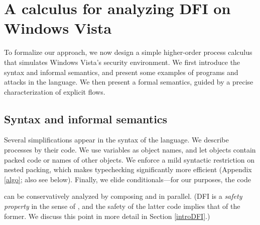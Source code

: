 \documentclass{sigplanconf}
\begin{document}
\section{A calculus for analyzing DFI on Windows Vista}\label{calc}
To formalize our approach, we now design a simple higher-order process calculus that simulates Windows Vista's security environment. We first introduce the syntax and informal semantics, and present some examples of programs and attacks in the language. We then present a formal semantics, guided by a precise characterization of explicit flows. 

\subsection{Syntax and informal semantics}

Several simplifications appear in the syntax of the language. We describe processes by their code. We use variables as object names, and let objects contain packed code or names of other objects. We enforce a mild syntactic restriction on nested packing, which makes typechecking significantly more efficient (Appendix \ref{algo}; also see below). 
Finally, we elide conditionals---for our purposes, the code 

can be conservatively analyzed by composing  and  in parallel. (DFI is a \emph{safety property} in the sense of \cite{alpernschneider}, and the safety of the latter code implies that of the former. We discuss this point in more detail in Section \ref{introDFI}.) 
\end{document}
